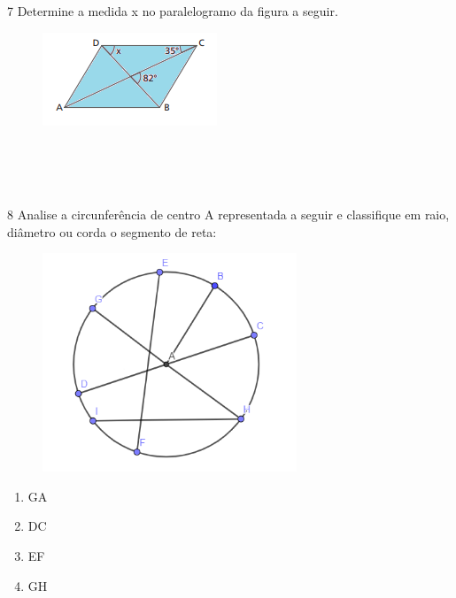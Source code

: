 {{\num{7} Determine a medida x no paralelogramo da figura a seguir.

\begin{figure}[H]
\centering\includegraphics[width=2.05208in,height=1.09375in]{./imgSAEB_8_MAT/media/image11.png}
\end{figure}

\\
\\
\\

\pagebreak

\num{8} Analise a circunferência de centro A representada a seguir e
classifique em raio, diâmetro ou corda o segmento de reta:

\begin{figure}[H]
\centering\includegraphics[width=2.98681in,height=2.57292in]{./imgSAEB_8_MAT/media/image12.png}
\end{figure}

\begin{enumerate}
\item GA

\item DC

\item EF

\item GH


\end{enumerate}}}

